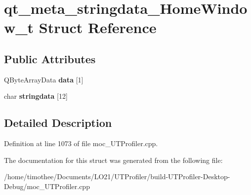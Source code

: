 \hypertarget{structqt__meta__stringdata___home_window__t}{\section{qt\-\_\-meta\-\_\-stringdata\-\_\-\-Home\-Window\-\_\-t Struct Reference}
\label{structqt__meta__stringdata___home_window__t}
}
\subsection*{Public Attributes}
\begin{DoxyCompactItemize}
\item 
\hypertarget{structqt__meta__stringdata___home_window__t_a64121fd145bf51f5500e6a1903bb8ee2}{Q\-Byte\-Array\-Data {\bfseries data} \mbox{[}1\mbox{]}}\label{structqt__meta__stringdata___home_window__t_a64121fd145bf51f5500e6a1903bb8ee2}

\item 
\hypertarget{structqt__meta__stringdata___home_window__t_af51d1c571fa38cf04ac3be1bc2067171}{char {\bfseries stringdata} \mbox{[}12\mbox{]}}\label{structqt__meta__stringdata___home_window__t_af51d1c571fa38cf04ac3be1bc2067171}

\end{DoxyCompactItemize}


\subsection{Detailed Description}


Definition at line 1073 of file moc\-\_\-\-U\-T\-Profiler.\-cpp.



The documentation for this struct was generated from the following file\-:\begin{DoxyCompactItemize}
\item 
/home/timothee/\-Documents/\-L\-O21/\-U\-T\-Profiler/build-\/\-U\-T\-Profiler-\/\-Desktop-\/\-Debug/moc\-\_\-\-U\-T\-Profiler.\-cpp\end{DoxyCompactItemize}
